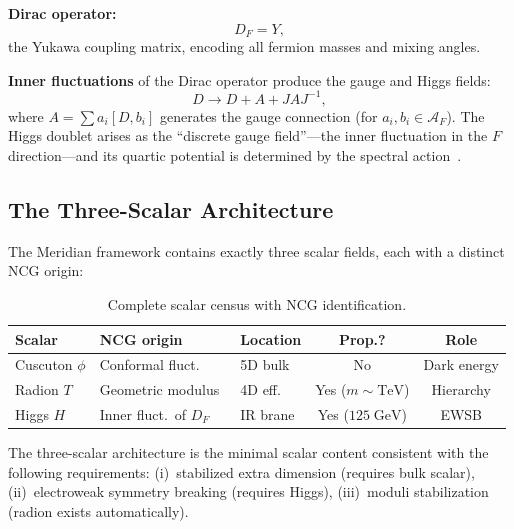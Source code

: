 \textbf{Dirac operator:}
\begin{equation}
  D_F = Y,
  \label{eq:4-64}
\end{equation}
the Yukawa coupling matrix, encoding all fermion masses and mixing angles.

\textbf{Inner fluctuations} of the Dirac operator produce the gauge and Higgs fields:
\begin{equation}
  D \to D + A + JAJ^{-1},
  \label{eq:4-65}
\end{equation}
where $A = \sum a_i [D, b_i]$ generates the gauge connection (for $a_i, b_i \in \mathcal{A}_F$). The Higgs doublet arises as the ``discrete gauge field''---the inner fluctuation in the $F$ direction---and its quartic potential is determined by the spectral action~\cite{ch4:CC1997}.


\subsection{The Three-Scalar Architecture}
\label{sec:4-three-scalar}

The Meridian framework contains exactly three scalar fields, each with a distinct NCG origin:

\begin{table}[htbp]
\centering
\caption{Complete scalar census with NCG identification.}
\label{tab:4-3}
\small
\begin{tabular}{@{}lllcc@{}}
\toprule
Scalar & NCG origin & Location & Prop.? & Role \\
\midrule
Cuscuton $\phi$ & Conformal fluct.\ & 5D bulk & No & Dark energy \\
Radion $T$ & Geometric modulus~\cite{ch4:GoldbergerWise1999} & 4D eff.\ & Yes ($m\!\sim\!\mathrm{TeV}$) & Hierarchy \\
Higgs $H$ & Inner fluct.\ of $D_F$ & IR brane & Yes ($125\;\mathrm{GeV}$) & EWSB \\
\bottomrule
\end{tabular}
\end{table}

\begin{proposition}[Minimality]\label{prop:4-3}
The three-scalar architecture is the minimal scalar content consistent with the following requirements: (i)~stabilized extra dimension (requires bulk scalar), (ii)~electroweak symmetry breaking (requires Higgs), (iii)~moduli stabilization (radion exists automatically).
\end{proposition}


